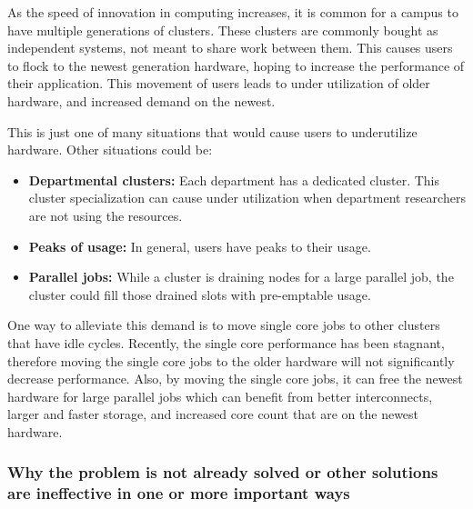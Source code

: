 \documentclass[11pt]{article}
\begin{document}
As the speed of innovation in computing increases, it is common for a campus to have multiple generations of clusters.  These clusters are commonly bought as independent systems, not meant to share work between them.  This causes users to flock to the newest generation hardware, hoping to increase the performance of their application.  This movement of users leads to under utilization of older hardware, and increased demand on the newest.

This is just one of many situations that would cause users to underutilize hardware.  Other situations could be:

\begin{itemize}
\item \textbf{Departmental clusters:}  Each department has a dedicated cluster.  This cluster specialization can cause under utilization when department researchers are not using the resources.
\item \textbf{Peaks of usage:} In general, users have peaks to their usage.
\item \textbf{Parallel jobs:} While a cluster is draining nodes for a large parallel job, the cluster could fill those drained slots with pre-emptable usage.
\end{itemize}

One way to alleviate this demand is to move single core jobs to other clusters that have idle cycles.  Recently, the single core performance has been stagnant, therefore moving the single core jobs to the older hardware will not significantly decrease performance.  Also, by moving the single core jobs, it can free the newest hardware for large parallel jobs which can benefit from better interconnects, larger and faster storage, and increased core count that are on the newest hardware.



\subsubsection* {Why the problem is not already solved or other solutions 
are ineffective in one or more important ways}
\end{document}
